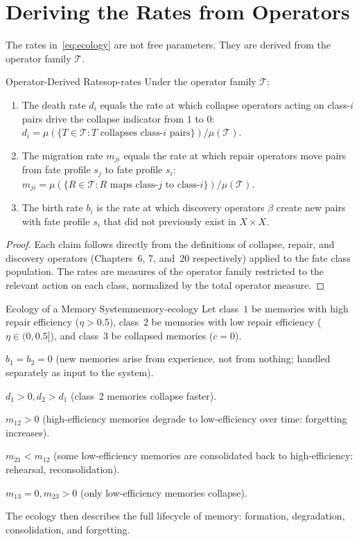 \documentclass[12pt,twoside,openright]{book}
\newcommand{\transfam}{\mathcal{T}}       %
\newcommand{\repEff}{\eta}               %
\newcommand{\collapseInd}{c}             %
\providecommand{\discOp}{\beta}
\begin{document}
\section{Deriving the Rates from Operators}

The rates in~\eqref{eq:ecology} are not free parameters.
They are derived from the operator family $\transfam$.

\begin{proposition}{Operator-Derived Rates}{op-rates}
Under the operator family $\transfam$:
\begin{enumerate}[nosep,label=(\roman*)]
  \item The death rate $d_i$ equals the rate at which
    collapse operators acting on class-$i$ pairs drive the
    collapse indicator from $1$ to $0$:
    $d_i = \mu(\{T\in\transfam: T\text{ collapses class-}i
    \text{ pairs}\})/\mu(\transfam)$.
  \item The migration rate $m_{ji}$ equals the rate at which
    repair operators move pairs from fate profile $s_j$ to
    fate profile $s_i$: $m_{ji}=\mu(\{R\in\transfam:
    R\text{ maps class-}j\text{ to class-}i\})/\mu(\transfam)$.
  \item The birth rate $b_i$ is the rate at which discovery
    operators $\discOp$ create new pairs with fate profile $s_i$
    that did not previously exist in $X\times X$.
\end{enumerate}
\begin{proof}
Each claim follows directly from the definitions of collapse,
repair, and discovery operators (Chapters~6, 7, and~20
respectively) applied to the fate class population. The
rates are measures of the operator family restricted to
the relevant action on each class, normalized by the total
operator measure.
\end{proof}
\end{proposition}

\begin{example}{Ecology of a Memory System}{memory-ecology}
Let class~$1$ be memories with high repair efficiency
($\repEff>0.5$), class~$2$ be memories with low repair
efficiency ($\repEff\in(0,0.5]$), and class~$3$ be collapsed
memories ($\collapseInd=0$).

$b_1=b_2=0$ (new memories arise from experience, not from
nothing; handled separately as input to the system).

$d_1>0, d_2>d_1$ (class~2 memories collapse faster).

$m_{12}>0$ (high-efficiency memories degrade to low-efficiency
over time: forgetting increases).

$m_{21}<m_{12}$ (some low-efficiency memories are consolidated
back to high-efficiency: rehearsal, reconsolidation).

$m_{13}=0, m_{23}>0$ (only low-efficiency memories collapse).

The ecology then describes the full lifecycle of memory:
formation, degradation, consolidation, and forgetting.
\end{example}
\end{document}
